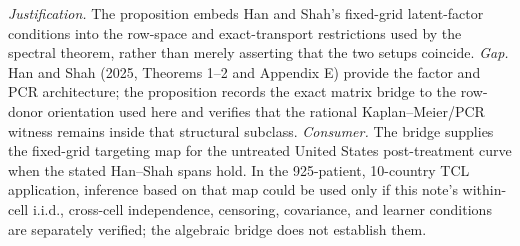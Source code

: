 \documentclass{article}
\begin{document}
\par\smallskip\noindent \textit{Justification.} The proposition embeds Han and Shah's fixed-grid latent-factor conditions into the row-space and exact-transport restrictions used by the spectral theorem, rather than merely asserting that the two setups coincide. \textit{Gap.} Han and Shah (2025, Theorems 1--2 and Appendix E) provide the factor and PCR architecture; the proposition records the exact matrix bridge to the row-donor orientation used here and verifies that the rational Kaplan--Meier/PCR witness remains inside that structural subclass. \textit{Consumer.} The bridge supplies the fixed-grid targeting map for the untreated United States post-treatment curve when the stated Han--Shah spans hold. In the 925-patient, 10-country TCL application, inference based on that map could be used only if this note's within-cell i.i.d., cross-cell independence, censoring, covariance, and learner conditions are separately verified; the algebraic bridge does not establish them.
\end{document}

